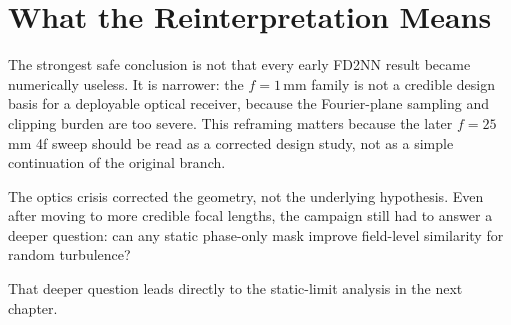 \section{What the Reinterpretation Means}

The strongest safe conclusion is not that every early FD2NN result became
numerically useless. It is narrower: the $f=1$\,mm family is not a credible
design basis for a deployable optical receiver, because the Fourier-plane
sampling and clipping burden are too severe. This reframing matters because the
later $f=25$\,mm 4f sweep should be read as a corrected design study, not as a
simple continuation of the original branch.

\begin{keyinsight}
The optics crisis corrected the geometry, not the underlying hypothesis. Even
after moving to more credible focal lengths, the campaign still had to answer a
deeper question: can any static phase-only mask improve field-level similarity
for random turbulence?
\end{keyinsight}

That deeper question leads directly to the static-limit analysis in the next
chapter.
